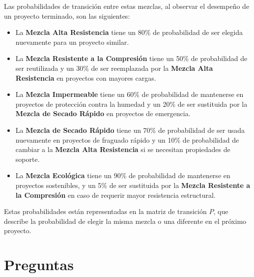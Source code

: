 \documentclass{article}
\begin{document}
Las probabilidades de transición entre estas mezclas, al observar el desempeño de un proyecto terminado, son las siguientes:
\begin{itemize}
    \item La \textbf{Mezcla Alta Resistencia} tiene un 80\% de probabilidad de ser elegida nuevamente para un proyecto similar.
    \item La \textbf{Mezcla Resistente a la Compresión} tiene un 50\% de probabilidad de ser reutilizada y un 30\% de ser reemplazada por la \textbf{Mezcla Alta Resistencia} en proyectos con mayores cargas.
    \item La \textbf{Mezcla Impermeable} tiene un 60\% de probabilidad de mantenerse en proyectos de protección contra la humedad y un 20\% de ser sustituida por la \textbf{Mezcla de Secado Rápido} en proyectos de emergencia.
    \item La \textbf{Mezcla de Secado Rápido} tiene un 70\% de probabilidad de ser usada nuevamente en proyectos de fraguado rápido y un 10\% de probabilidad de cambiar a la \textbf{Mezcla Alta Resistencia} si se necesitan propiedades de soporte.
    \item La \textbf{Mezcla Ecológica} tiene un 90\% de probabilidad de mantenerse en proyectos sostenibles, y un 5\% de ser sustituida por la \textbf{Mezcla Resistente a la Compresión} en caso de requerir mayor resistencia estructural.
\end{itemize}

Estas probabilidades están representadas en la matriz de transición \( P \), que describe la probabilidad de elegir la misma mezcla o una diferente en el próximo proyecto.

\section*{Preguntas}
\end{document}
